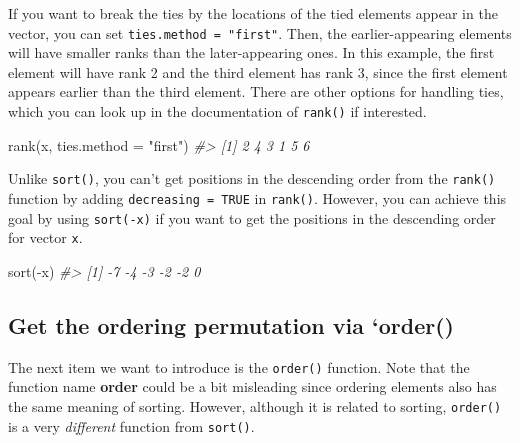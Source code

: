 \documentclass[
]{book}
\newenvironment{Shaded}{\begin{snugshade}}{\end{snugshade}}
\newcommand{\AttributeTok}[1]{\textcolor[rgb]{0.77,0.63,0.00}{#1}}
\newcommand{\CommentTok}[1]{\textcolor[rgb]{0.56,0.35,0.01}{\textit{#1}}}
\newcommand{\FunctionTok}[1]{\textcolor[rgb]{0.00,0.00,0.00}{#1}}
\newcommand{\NormalTok}[1]{#1}
\newcommand{\SpecialCharTok}[1]{\textcolor[rgb]{0.00,0.00,0.00}{#1}}
\newcommand{\StringTok}[1]{\textcolor[rgb]{0.31,0.60,0.02}{#1}}
\newenvironment{blackbox}{
  \definecolor{shadecolor}{rgb}{0, 0, 0}  %
  \color{white}
  \begin{shaded}}
 {\end{shaded}}
\newenvironment{infobox}[1]
  {
  \begin{itemize}
  \renewcommand{\labelitemi}{
    \raisebox{-.7\height}[0pt][0pt]{
      {\setkeys{Gin}{width=3em,keepaspectratio}
        \texttt{[image: pics/\#1]}}
    }
  }
  \setlength{\fboxsep}{1em}
  \begin{blackbox}
  \item
  }
  {
  \end{blackbox}
  \end{itemize}
  }
\begin{document}
If you want to break the ties by the locations of the tied elements appear in the vector, you can set \texttt{ties.method\ =\ "first"}. Then, the earlier-appearing elements will have smaller ranks than the later-appearing ones. In this example, the first element will have rank 2 and the third element has rank 3, since the first element appears earlier than the third element. There are other options for handling ties, which you can look up in the documentation of \texttt{rank()} if interested.

\begin{Shaded}
\begin{Highlighting}[]
\FunctionTok{rank}\NormalTok{(x, }\AttributeTok{ties.method =} \StringTok{"first"}\NormalTok{)}
\CommentTok{\#\textgreater{} [1] 2 4 3 1 5 6}
\end{Highlighting}
\end{Shaded}

\begin{infobox}{caution}

Unlike \texttt{sort()}, you can't get positions in the descending order from the \texttt{rank()} function by adding \texttt{decreasing\ =\ TRUE} in \texttt{rank()}. However, you can achieve this goal by using \texttt{sort(-x)} if you want to get the positions in the descending order for vector \texttt{x}.

\begin{Shaded}
\begin{Highlighting}[]
\FunctionTok{sort}\NormalTok{(}\SpecialCharTok{{-}}\NormalTok{x)}
\CommentTok{\#\textgreater{} [1] {-}7 {-}4 {-}3 {-}2 {-}2  0}
\end{Highlighting}
\end{Shaded}

\end{infobox}

\hypertarget{get-the-ordering-permutation-via-order}{%
\subsection{Get the ordering permutation via `order()}\label{get-the-ordering-permutation-via-order}}

The next item we want to introduce is the \texttt{order()} function. Note that the function name \textbf{order} could be a bit misleading since ordering elements also has the same meaning of sorting. However, although it is related to sorting, \texttt{order()} is a very \emph{different} function from \texttt{sort()}.
\end{document}
